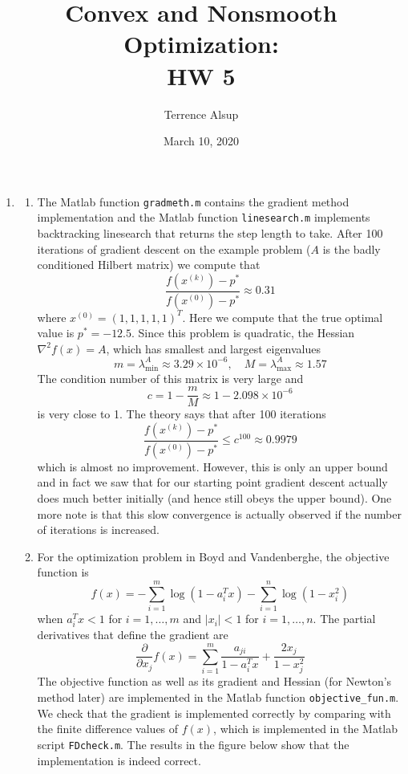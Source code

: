 \documentclass[11pt]{amsart}
\title{Convex and Nonsmooth Optimization:\\HW 5}
\author{Terrence Alsup}
\date{March 10, 2020}
\begin{document}
\maketitle
\begin{enumerate}
\item \begin{enumerate}

\item The Matlab function \texttt{gradmeth.m} contains the gradient method implementation and the Matlab function \texttt{linesearch.m} implements backtracking linesearch that returns the step length to take.  After 100 iterations of gradient descent on the example problem ($A$ is the badly conditioned Hilbert matrix) we compute that
\[
\frac{f(x^{(k)}) - p^*}{f(x^{(0)}) - p^*} \approx 0.31
\]
where $x^{(0)} = (1,1,1,1,1)^T$.  Here we compute that the true optimal value is $p^* = -12.5$.  Since this problem is quadratic, the Hessian $\nabla^2 f(x) = A$, which has smallest and largest eigenvalues
\[
m = \lambda_{\min}^A \approx 3.29 \times 10^{-6},\quad M = \lambda_{\max}^A \approx 1.57
\]
The condition number of this matrix is very large and
\[
c = 1 - \frac{m}{M} \approx 1 - 2.098 \times 10^{-6}
\]
is very close to 1.  The theory says that after 100 iterations
\[
\frac{f(x^{(k)}) - p^*}{f(x^{(0)}) - p^*} \le c^{100} \approx 0.9979
\]
which is almost no improvement.  However, this is only an upper bound and in fact we saw that for our starting point gradient descent actually does much better initially (and hence still obeys the upper bound).  One more note is that this slow convergence is actually observed if the number of iterations is increased.


\item For the optimization problem in Boyd and Vandenberghe, the objective function is
\[
f(x) = -\sum_{i=1}^m \log(1 - a_i^Tx) - \sum_{i=1}^n \log(1 - x_i^2)
\]  
when $a_i^T x < 1$ for $i=1,\ldots,m$ and $|x_i| < 1$ for $i=1,\ldots,n$.  The partial derivatives that define the gradient are
\[
\frac{\partial}{\partial x_j}f(x) = \sum_{i=1}^m \frac{a_{ji}}{1 - a_i^Tx} + \frac{2x_j}{1 - x_j^2}
\]
The objective function as well as its gradient and Hessian (for Newton's method later) are implemented in the Matlab function \texttt{objective\_fun.m}.  We check that the gradient is implemented correctly by comparing with the finite difference values of $f(x)$, which is implemented in the Matlab script \texttt{FDcheck.m}.  The results in the figure below show that the implementation is indeed correct.


\end{enumerate}
\end{enumerate}
\end{document}
